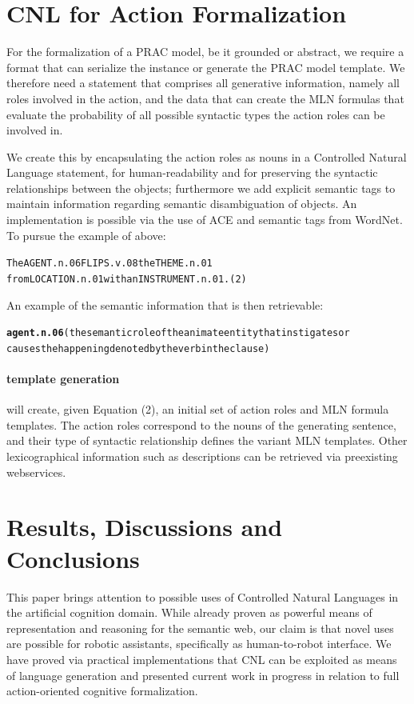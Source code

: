 \documentclass[oribibl]{llncs}
\begin{document}
\section{CNL for Action Formalization}
For the formalization of a PRAC model, be it grounded or abstract, we 
require a format that can serialize the instance or generate the PRAC 
model template.
We therefore need a statement that comprises all generative information,
 namely all roles involved in the action, and the data that can create 
 the MLN formulas that evaluate the probability of all possible syntactic 
types the action roles can be involved in.

We create this by encapsulating the action roles as nouns in a Controlled 
Natural Language statement, for human-readability and for preserving the 
syntactic relationships between the objects; furthermore we add explicit 
semantic tags to maintain information regarding semantic disambiguation
 of objects.
An implementation is possible via the use of ACE and semantic tags from 
WordNet\cite{Miller95wordnet:a}. To pursue the example of above:
\begin{alltt}
The AGENT.n.06 FLIPS.v.08 the THEME.n.01 
from LOCATION.n.01 with an INSTRUMENT.n.01. \hfill {\normalfont (2)}
\end{alltt}
An example of the semantic information that is then retrievable:
{\small
\begin{alltt}
\textbf{agent.n.06} {\color{red}(the semantic role of the animate entity that instigates or 
causes the happening denoted by the verb in the clause)}
\end{alltt}}

\paragraph{template generation} will create, given Equation (2), 
an initial set of action roles and MLN formula templates.  
The action roles correspond to the nouns of the generating sentence, 
and their type of syntactic relationship defines the variant MLN 
templates. Other lexicographical 
information such as descriptions can be retrieved via preexisting 
webservices.

\section{Results, Discussions and Conclusions}
This paper brings attention to possible uses of Controlled Natural 
Languages in the artificial cognition domain. While already proven 
as powerful means of representation and reasoning for the semantic 
web\cite{kaljurand:phd}, our claim is that novel uses are possible 
for robotic assistants, specifically as human-to-robot interface.
We have proved via practical implementations that CNL can be exploited
 as means of language generation and presented current work in progress
  in relation to full action-oriented cognitive formalization.
\end{document}
